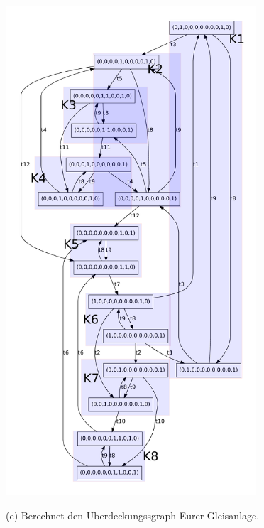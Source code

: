 \documentclass{scrreprt}
\begin{document}
\begin{enumerate}
\includegraphics[width=0.7\textwidth]{kg_easy.pdf}

(e) Berechnet den Uberdeckungssgraph Eurer Gleisanlage.


\end{enumerate}
\end{document}

